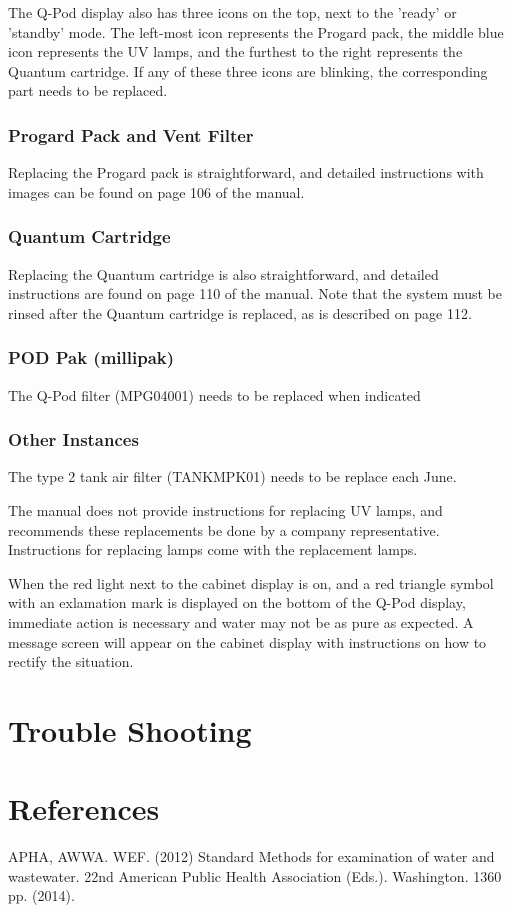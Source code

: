 \documentclass[12pt]{../SOP3_beta}\usepackage[]{graphicx}\usepackage[]{color}
\begin{document}
\NP The Q-Pod display also has three icons on the top, next to the 'ready' or 'standby' mode. The left-most icon represents the Progard pack, the middle blue icon represents the UV lamps, and the furthest to the right represents the Quantum cartridge. If any of these three icons are blinking, the corresponding part needs to be replaced.

\subsubsection{Progard Pack and Vent Filter}

\NP Replacing the Progard pack is straightforward, and detailed instructions with images can be found on page 106 of the manual.

\subsubsection{Quantum Cartridge}

\NP Replacing the Quantum cartridge is also straightforward, and detailed instructions are found on page 110 of the manual. Note that the system must be rinsed after the Quantum cartridge is replaced, as is described on page 112. 

\subsubsection{POD Pak (millipak)}

\NP The Q-Pod filter (MPG04001) needs to be replaced when indicated

\subsubsection{Other Instances}

\NP The type 2 tank air filter (TANKMPK01) needs to be replace each June. 

\NP The manual does not provide instructions for replacing UV lamps, and recommends these replacements be done by a company representative. Instructions for replacing lamps come with the replacement lamps.

\NP When the red light next to the cabinet display is on, and a red triangle symbol with an exlamation mark is displayed on the bottom of the Q-Pod display, immediate action is necessary and water may not be as pure as expected. A message screen will appear on the cabinet display with instructions on how to rectify the situation. 

\section{Trouble Shooting}

\section{References}

\NP APHA, AWWA. WEF. (2012) Standard Methods for examination of water and wastewater. 22nd American Public Health Association (Eds.). Washington. 1360 pp. (2014).
\end{document}
